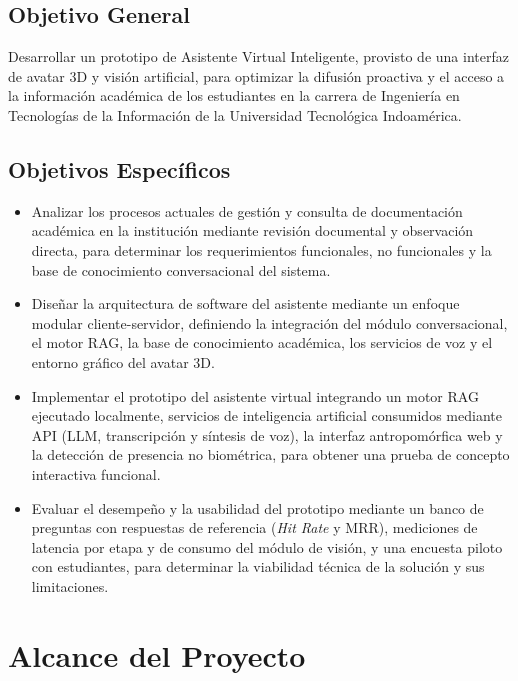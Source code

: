 \subsection{Objetivo General}
Desarrollar un prototipo de Asistente Virtual Inteligente, provisto de una interfaz de avatar 3D y visión artificial, para optimizar la difusión proactiva y el acceso a la información académica de los estudiantes en la carrera de Ingeniería en Tecnologías de la Información de la Universidad Tecnológica Indoamérica.

\subsection{Objetivos Específicos}
\begin{itemize}
    \item Analizar los procesos actuales de gestión y consulta de documentación académica en la institución mediante revisión documental y observación directa, para determinar los requerimientos funcionales, no funcionales y la base de conocimiento conversacional del sistema.
    \item Diseñar la arquitectura de software del asistente mediante un enfoque modular cliente-servidor, definiendo la integración del módulo conversacional, el motor RAG, la base de conocimiento académica, los servicios de voz y el entorno gráfico del avatar 3D.
    \item Implementar el prototipo del asistente virtual integrando un motor RAG ejecutado localmente, servicios de inteligencia artificial consumidos mediante API (LLM, transcripción y síntesis de voz), la interfaz antropomórfica web y la detección de presencia no biométrica, para obtener una prueba de concepto interactiva funcional.
    \item Evaluar el desempeño y la usabilidad del prototipo mediante un banco de preguntas con respuestas de referencia (\textit{Hit Rate} y MRR), mediciones de latencia por etapa y de consumo del módulo de visión, y una encuesta piloto con estudiantes, para determinar la viabilidad técnica de la solución y sus limitaciones.
\end{itemize}

\section{Alcance del Proyecto}

